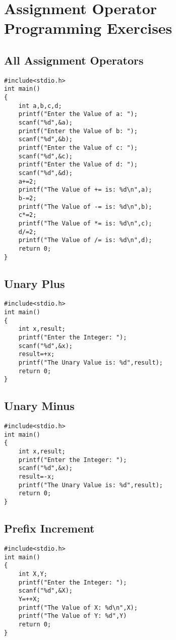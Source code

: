 \documentclass[a4paper,14pt]{article}
\begin{document}
\section{Assignment Operator Programming Exercises}


\subsection{All Assignment Operators}
\vspace{0.5cm}
\begin{lstlisting}[caption={All Assignment Operators}]
#include<stdio.h>
int main()
{
    int a,b,c,d;
    printf("Enter the Value of a: ");
    scanf("%d",&a);
    printf("Enter the Value of b: ");
    scanf("%d",&b);
    printf("Enter the Value of c: ");
    scanf("%d",&c);
    printf("Enter the Value of d: ");
    scanf("%d",&d);
    a+=2;
    printf("The Value of += is: %d\n",a);
    b-=2;
    printf("The Value of -= is: %d\n",b);
    c*=2;
    printf("The Value of *= is: %d\n",c);
    d/=2;
    printf("The Value of /= is: %d\n",d);
    return 0;
}
\end{lstlisting}
\newpage

\subsection{Unary Plus}
\vspace{0.5cm}
\begin{lstlisting}[caption={Unary Plus}]
#include<stdio.h>
int main()
{
    int x,result;
    printf("Enter the Integer: ");
    scanf("%d",&x);
    result=+x;
    printf("The Unary Value is: %d",result);
    return 0;
}
\end{lstlisting}
\newpage

\subsection{Unary Minus}
\vspace{0.5cm}
\begin{lstlisting}[caption={Unary Minus}]
#include<stdio.h>
int main()
{
    int x,result;
    printf("Enter the Integer: ");
    scanf("%d",&x);
    result=-x;
    printf("The Unary Value is: %d",result);
    return 0;
}
\end{lstlisting}
\newpage

\subsection{Prefix Increment}
\vspace{0.5cm}
\begin{lstlisting}[caption={Prefix Increment}]
#include<stdio.h>
int main()
{
    int X,Y;
    printf("Enter the Integer: ");
    scanf("%d",&X);
    Y=++X;
    printf("The Value of X: %d\n",X);
    printf("The Value of Y: %d",Y)
    return 0;
}
\end{lstlisting}
\newpage
\end{document}
